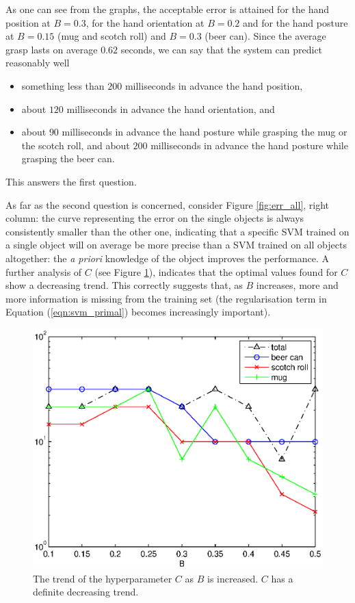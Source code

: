 As one can see from the graphs, the acceptable error is attained for
the hand position at $B=0.3$, for the hand orientation at $B=0.2$ and
for the hand posture at $B=0.15$ (mug and scotch roll) and $B=0.3$
(beer can). Since the average grasp lasts on average $0.62$ seconds,
we can say that the system can predict reasonably well

\begin{itemize}

  \item something less than $200$ milliseconds in advance the hand
    position,

  \item about $120$ milliseconds in advance the hand orientation, and

  \item about $90$ milliseconds in advance the hand posture while
    grasping the mug or the scotch roll, and about $200$ milliseconds
    in advance the hand posture while grasping the beer can.

\end{itemize}

This answers the first question.

As far as the second question is concerned, consider Figure
\ref{fig:err_all}, right column: the curve representing the error on
the single objects is always consistently smaller than the other one,
indicating that a specific SVM trained on a single object will on
average be more precise than a SVM trained on all objects altogether:
the \emph{a priori} knowledge of the object improves the
performance. A further analysis of $C$ (see Figure \ref{fig:C_trend}),
indicates that the optimal values found for $C$ show a decreasing
trend. This correctly suggests that, as $B$ increases, more and more
information is missing from the training set (the regularisation term
in Equation (\ref{eqn:svm_primal}) becomes increasingly important).

\begin{figure}[htbp]
  \begin{center}
    \includegraphics[width=0.5\linewidth]{C_trend.eps}
    \caption{The trend of the hyperparameter $C$ as $B$ is
    increased. $C$ has a definite decreasing trend.}
    \label{fig:C_trend}
  \end{center}
\end{figure}

